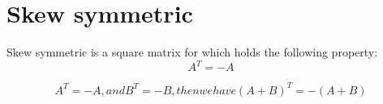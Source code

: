 \section{Skew symmetric}

Skew symmetric is a square matrix for which holds the following property:
\[A^T = -A\]

\[A^T = -A, and B^T= -B, then we have (A + B)^T = -(A + B)\]